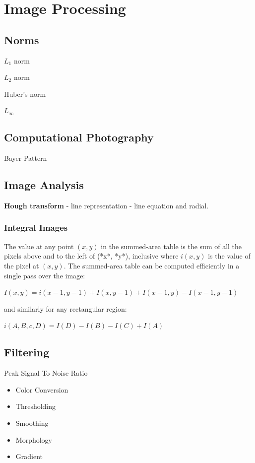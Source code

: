 \chapter{Image Processing}

\section{Norms}

$L_1$ norm

$L_2$ norm

Huber’s norm

$L_\infty $

\section{Computational Photography}

Bayer Pattern

\section{Image Analysis}

\textbf{Hough transform} - line representation - line equation and radial.

\subsection{Integral Images}

The value at any point $(x, y)$ in the summed-area table is the sum of all the pixels above and to the left of (*x*, *y*), inclusive where $i(x,y)$  is the value of the pixel at $(x,y)$. The summed-area table can be computed efficiently in a single pass over the image:

$I(x,y) = i(x-1,y-1) + I(x,y-1) + I(x-1,y)-I(x-1,y-1)$

and similarly for any rectangular region:

$ i(A,B,c,D) = I(D) - I(B) - I(C)+I(A)$

\section{ Filtering}

Peak Signal To Noise Ratio 

\begin{itemize}
\item Color Conversion
\item Thresholding
\item Smoothing
\item Morphology
\item Gradient
\end{itemize}


